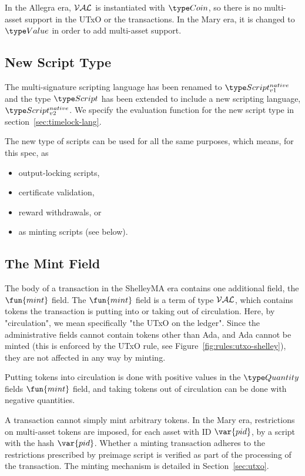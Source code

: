 In the Allegra era, $\mathcal{VAL}$ is instantiated with $\Coin$, so there is no
multi-asset support in the UTxO or the transactions. In the Mary era, it
is changed to $\Value$ in order to add multi-asset support.

\subsection*{New Script Type}

The multi-signature scripting language has been renamed to $\ScriptNI$ and
the type $\Script$ has been extended to include a new scripting language,
$\Timelock$. We specify the evaluation
function for the new script type in section~\ref{sec:timelock-lang}.

The new type of scripts can be used for all the same purposes, which means, for this
spec, as

\begin{itemize}
  \item output-locking scripts,
  \item certificate validation,
  \item reward withdrawals, or
  \item as minting scripts (see below).
\end{itemize}

\subsection*{The Mint Field}

The body of a transaction in the ShelleyMA era contains one additional
field, the $\fun{mint}$ field.
The $\fun{mint}$ field is a term of type $\mathcal{VAL}$, which contains
tokens the transaction is putting into or taking out of
circulation. Here, by "circulation", we mean specifically "the UTxO on the
ledger". Since the administrative fields cannot contain tokens other than Ada,
and Ada cannot be minted (this is enforced by the UTxO rule, see Figure~\ref{fig:rules:utxo-shelley}),
they are not affected in any way by minting.

Putting tokens into circulation is done with positive values in the $\Quantity$
fields $\fun{mint}$ field, and taking tokens out of circulation can be done
with negative quantities.

A transaction cannot simply mint arbitrary tokens. In the Mary era, restrictions on
multi-asset tokens are imposed, for each asset with ID $\var{pid}$, by a script
with the hash $\var{pid}$. Whether a minting transaction adheres to the restrictions
prescribed by preimage script is verified as part of the processing of the transaction.
The minting mechanism is detailed in Section~\ref{sec:utxo}.

